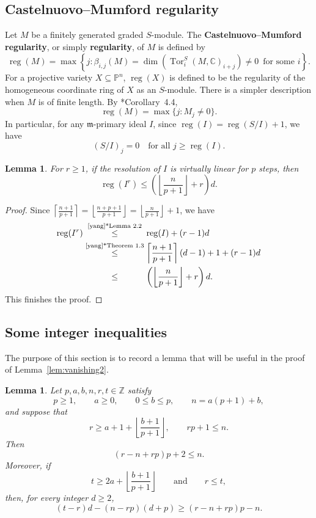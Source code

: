 \documentclass[11pt,letterpaper,reqno]{amsart}
\newcommand{\CC}{\mathbb{C}}
\newcommand{\m}{\mathfrak{m}}
\newcommand{\Tor}{\operatorname{Tor}}
\newcommand{\reg}{\operatorname{reg}}
\def\PP{{\mathbb P}}
\newtheorem{lemma}[theorem]{Lemma}
\theoremstyle{definition}
\numberwithin{equation}{section}
\begin{document}
\subsection{Castelnuovo--Mumford regularity}\label{sec:prelim-CM}
Let $M$ be a finitely generated graded $S$-module. The \textbf{Castelnuovo--Mumford regularity}, or simply \textbf{regularity}, of $M$ is defined by
\[\reg(M) = \max\left\{j \colon \beta_{i,j}(M) = \dim\left( \Tor_i^S(M,\CC)_{i+j}\right) \ne 0 \,\text{ for some }i \right\}.\]
For a projective variety $X \subseteq \PP^n$, $\reg(X)$ is defined to be the regularity of the homogeneous coordinate ring of $X$ as an $S$-module. There is a simpler description when $M$ is of finite length. By \cite{DE-syzygies}*{Corollary~4.4},
\begin{equation}\label{eq:regFL}
    \reg(M) = \max\{j \colon M_j \ne 0\}.
\end{equation}
In particular, for any $\m$-primary ideal $I$, since $\reg(I) = \reg(S/I) + 1$, we have
\begin{equation}\label{eq:regOfIimpliesvanishing}
    (S/I)_{j} = 0 \quad \text{for all }j \ge \reg(I).
\end{equation}
\begin{lemma}\label{lem:regofpowers}
    For $r \ge 1$, if the resolution of $I$ is virtually linear for $p$ steps, then
    \[\reg(I^r) \le \left(\left\lfloor \frac{n}{p+1}\right\rfloor  + r\right)d.\]
\end{lemma}
\begin{proof}
    Since $\left\lceil \frac{n+1}{p+1}\right\rceil = \left\lfloor \frac{n+p+1}{p+1}\right\rfloor = \left\lfloor \frac{n}{p+1}\right\rfloor + 1$, we have
    \begin{align*}
        \reg(I^r) &\overset{\text{\makebox[\widthof{\scriptsize \text{\cite{yang}*{Theorem~1.3}}}][c]{\text{\cite{yang}*{Lemma~2.2}}}}}{\le} \reg(I)+(r-1)d \\
        &\overset{\text{\cite{yang}*{Theorem~1.3}}}{\le}\left\lceil \frac{n+1}{p+1}\right\rceil(d-1)+1 + (r-1)d\\
        &\overset{\hphantom{\text{\cite{yang}*{Theorem~1.3}}}}{\le} \left(\left\lfloor \frac{n}{p+1}\right\rfloor  + r\right)d.
    \end{align*}
    This finishes the proof.
\end{proof}
\subsection{Some integer inequalities}
The purpose of this section is to record a lemma that will be useful in the proof of Lemma~\ref{lem:vanishing2}.
\begin{lemma}\label{lem:inequal}
Let $p,a,b,n,r,t\in \mathbb{Z}$ satisfy
\[p\ge 1,\qquad a\ge 0,\qquad 0\le b\le p,\qquad n=a(p+1)+b,\]
and suppose that
\[r\ge a+1+\left\lfloor\frac{b+1}{p+1}\right\rfloor,\qquad rp+1\le n.\]
Then
\[(r-n+rp)p+2\le n.\]
Moreover, if
\[t\ge 2a+\left\lfloor\frac{b+1}{p+1}\right\rfloor\qquad\text{and}\qquad r\le t,\]
then, for every integer $d\ge 2$,
\[(t-r)d-(n-rp)(d+p)\ge (r-n+rp)p-n.\]
\end{lemma}
\end{document}
